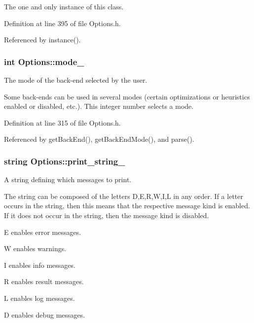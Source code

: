The one and only instance of this class. 



Definition at line 395 of file Options.\-h.



Referenced by instance().

\hypertarget{classOptions_a4554d07501f73bbccb9e2628016f2d20}{
\subsubsection[{mode\-\_\-}]{\setlength{\rightskip}{0pt plus 5cm}int Options\-::mode\-\_\-\hspace{0.3cm}{\ttfamily [protected]}}}\label{classOptions_a4554d07501f73bbccb9e2628016f2d20}


The mode of the back-\/end selected by the user. 

Some back-\/ends can be used in several modes (certain optimizations or heuristics enabled or disabled, etc.). This integer number selects a mode. 

Definition at line 315 of file Options.\-h.



Referenced by get\-Back\-End(), get\-Back\-End\-Mode(), and parse().

\hypertarget{classOptions_a6a29a69625b7962036c8c39746afc5c3}{
\subsubsection[{print\-\_\-string\-\_\-}]{\setlength{\rightskip}{0pt plus 5cm}string Options\-::print\-\_\-string\-\_\-\hspace{0.3cm}{\ttfamily [protected]}}}\label{classOptions_a6a29a69625b7962036c8c39746afc5c3}


A string defining which messages to print. 

The string can be composed of the letters D,E,R,W,I,L in any order. If a letter occurs in the string, then this means that the respective message kind is enabled. If it does not occur in the string, then the message kind is disabled. 
\begin{DoxyItemize}
\item E enables error messages. 
\item W enables warnings. 
\item I enables info messages. 
\item R enables result messages. 
\item L enables log messages. 
\item D enables debug messages. 
\end{DoxyItemize}

